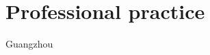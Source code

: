 \documentclass[]{baharmon_cv}
\begin{document}
\section{Professional practice}
\begin{minipage}[t]{0.85\textwidth} 
\end{minipage}
\begin{minipage}[t]{0.15\textwidth} 
Guangzhou%
\end{minipage}\\

\sectiondivider






\end{document}
